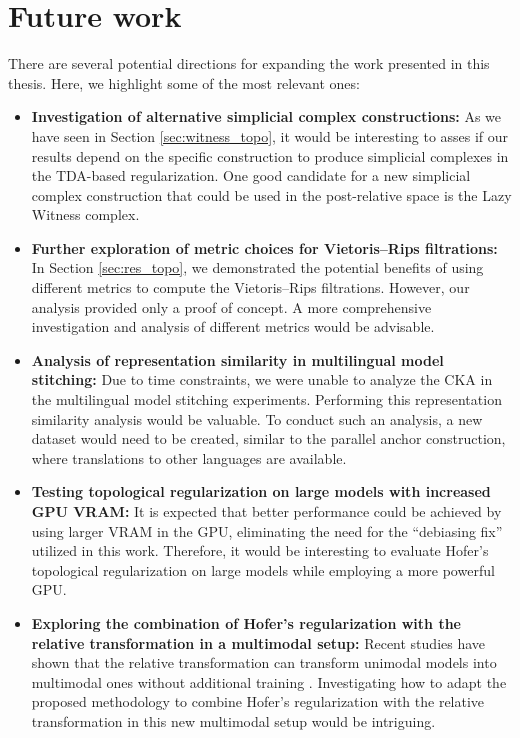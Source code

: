\documentclass[../main.tex]{subfiles}
\begin{document}
\section{Future work}
\label{sec:futureWork}
There are several potential directions for expanding the work presented in this thesis. Here, we highlight some of the most relevant ones:
\begin{itemize}
    \item \textbf{Investigation of alternative simplicial complex constructions:} As we have seen in Section \ref{sec:witness_topo}, it would be interesting to asses if our results depend on the specific construction to produce simplicial complexes in the TDA-based regularization. One good candidate for a new simplicial complex construction that could be used in the post-relative space is the Lazy Witness complex.

    \item \textbf{Further exploration of metric choices for Vietoris–Rips filtrations:} In Section \ref{sec:res_topo}, we demonstrated the potential benefits of using different metrics to compute the Vietoris–Rips filtrations. However, our analysis provided only a proof of concept. A more comprehensive investigation and analysis of different metrics would be advisable.

    \item \textbf{Analysis of representation similarity in multilingual model stitching:} Due to time constraints, we were unable to analyze the CKA in the multilingual model stitching experiments. Performing this representation similarity analysis would be valuable. To conduct such an analysis, a new dataset would need to be created, similar to the parallel anchor construction, where translations to other languages are available.

    \item \textbf{Testing topological regularization on large models with increased GPU VRAM:} It is expected that better performance could be achieved by using larger VRAM in the GPU, eliminating the need for the ``debiasing fix'' utilized in this work. Therefore, it would be interesting to evaluate Hofer's topological regularization on large models while employing a more powerful GPU.

    \item \textbf{Exploring the combination of Hofer's regularization with the relative transformation in a multimodal setup:} Recent studies have shown that the relative transformation can transform unimodal models into multimodal ones without additional training \cite{norelli_asif_2022}. Investigating how to adapt the proposed methodology to combine Hofer's regularization with the relative transformation in this new multimodal setup would be intriguing.
\end{itemize}
\end{document}
